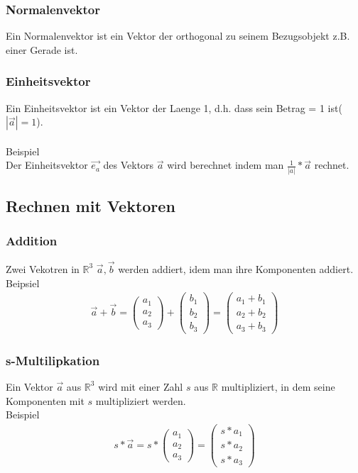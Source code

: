 \documentclass[a4paper]{article} %
\begin{document}
	\subsubsection{Normalenvektor}
	Ein Normalenvektor ist ein Vektor der orthogonal zu seinem Bezugsobjekt z.B. einer Gerade ist. 
	\subsubsection{Einheitsvektor}
	Ein Einheitsvektor ist ein Vektor der Laenge 1, d.h. dass sein Betrag = 1 ist($|\vec{a}|=1$).
	\\\\Beispiel\\
	Der Einheitsvektor $\vec{e_a}$ des Vektors $\vec{a}$ wird berechnet indem man $\frac{1}{|a|}*\vec{a}$ rechnet.
	\subsection{Rechnen mit Vektoren}
	\subsubsection{Addition}
	Zwei Vekotren in $\mathbb{R}^3$ $\vec{a}, \vec{b}$ werden addiert, idem man ihre Komponenten addiert.
	\\Beipsiel\\
	\begin{align*} \vec{a}+\vec{b}=\begin{pmatrix}a_1\\a_2\\a_3\end{pmatrix}+\begin{pmatrix}b_1\\b_2\\b_3\end{pmatrix}=\begin{pmatrix}a_1+b_1\\a_2+b_2\\a_3+b_3\end{pmatrix} \end{align*}
	\subsubsection{s-Multilipkation}
	Ein Vektor $\vec{a}$ aus $\mathbb{R}^3$  wird mit einer Zahl $s$ aus $\mathbb{R}$ multipliziert, in dem seine Komponenten mit $s$ multipliziert werden.\\Beispiel
	\begin{align*}  s*\vec{a}=s*\begin{pmatrix}a_1\\a_2\\a_3\end{pmatrix}=\begin{pmatrix}s*a_1\\s*a_2\\s*a_3\end{pmatrix} \end{align*}
\end{document}
